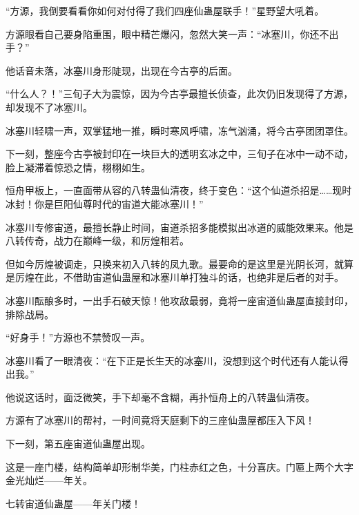 \begin{this_body}
“方源，我倒要看看你如何对付得了我们四座仙蛊屋联手！”星野望大吼着。

方源眼看自己要身陷重围，眼中精芒爆闪，忽然大笑一声：“冰塞川，你还不出手？”

他话音未落，冰塞川身形陡现，出现在今古亭的后面。

“什么人？！”三旬子大为震惊，因为今古亭最擅长侦查，此次仍旧发现得了方源，却发现不了冰塞川。

冰塞川轻啸一声，双掌猛地一推，瞬时寒风呼啸，冻气汹涌，将今古亭团团罩住。

下一刻，整座今古亭被封印在一块巨大的透明玄冰之中，三旬子在冰中一动不动，脸上凝滞着惊恐之情，栩栩如生。

恒舟甲板上，一直面带从容的八转蛊仙清夜，终于变色：“这个仙道杀招是……现时冰封！你是巨阳仙尊时代的宙道大能冰塞川！”

冰塞川专修宙道，最擅长静止时间，宙道杀招多能模拟出冰道的威能效果来。他是八转传奇，战力在巅峰一级，和厉煌相若。

但如今厉煌被调走，只换来初入八转的凤九歌。最要命的是这里是光阴长河，就算是厉煌在此，不借助宙道仙蛊屋和冰塞川单打独斗的话，也绝非是后者的对手。

冰塞川酝酿多时，一出手石破天惊！他攻敌最弱，竟将一座宙道仙蛊屋直接封印，排除战局。

“好身手！”方源也不禁赞叹一声。

冰塞川看了一眼清夜：“在下正是长生天的冰塞川，没想到这个时代还有人能认得出我。”

他说这话时，面泛微笑，手下却毫不含糊，再扑恒舟上的八转蛊仙清夜。

方源有了冰塞川的帮衬，一时间竟将天庭剩下的三座仙蛊屋都压入下风！

下一刻，第五座宙道仙蛊屋出现。

这是一座门楼，结构简单却形制华美，门柱赤红之色，十分喜庆。门匾上两个大字金光灿烂——年关。

七转宙道仙蛊屋——年关门楼！

\end{this_body}

